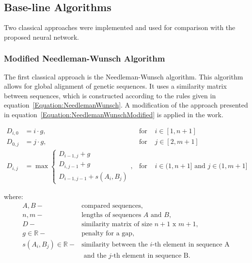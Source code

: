 \documentclass[pdflatex,sn-vancouver-num]{sn-jnl}%
\begin{document}
        \subsection{Base-line Algorithms}

            Two classical approaches were implemented and used for comparison with the proposed neural network.

            \subsubsection{Modified Needleman-Wunsch Algorithm}
                The first classical approach is the Needleman-Wunsch algorithm. This algorithm allows for global alignment of genetic sequences. It uses a similarity matrix between sequences, which is constructed according to the rules given in equation~\eqref{Equation:NeedlemanWunsch}. A modification of the approach presented in equation~\eqref{Equation:NeedlemanWunschModified} is applied in the work.

                \begin{equation}
                    \begin{aligned}
                        D_{i,0} &= i \cdot g, & \text{for } & i \in [1, n + 1] \\
                        D_{0,j} &= j \cdot g, & \text{for } & j \in [2, m + 1] \\
                        D_{i,j} &= \max
                        \begin{cases}
                            D_{i - 1, j} + g \\
                            D_{i, j - 1} + g \\
                            D_{i - 1, j - 1} + s(A_i, B_j)
                        \end{cases}, & \text{for } & i \in (1, n + 1] \text{ and } j \in (1, m + 1]
                    \end{aligned}
                    \label{Equation:NeedlemanWunsch}
                \end{equation}

                where:
                \begin{align*}
                    A, B -& \text{compared sequences}, \\
                    n, m -& \text{lengths of sequences } A \text{ and } B, \\
                    D -& \text{similarity matrix of size } n + 1 \text{ x } m + 1, \\
                    g \in \mathbb{R} -& \text{penalty for a gap}, \\
                    s(A_i, B_j) \in \mathbb{R} -& \text{similarity between the } i\text{-th element in sequence A} \\
                                                & \text{ and the } j\text{-th element in sequence B}.
                \end{align*}
\end{document}
